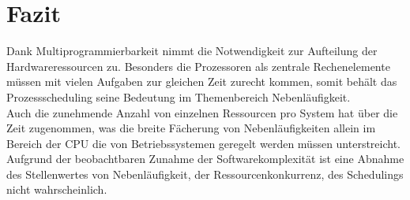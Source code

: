 \section{Fazit}
Dank Multiprogrammierbarkeit nimmt die Notwendigkeit zur Aufteilung der Hardwareressourcen zu. Besonders 
die Prozessoren als zentrale Rechenelemente müssen mit vielen Aufgaben zur gleichen Zeit zurecht kommen, 
somit behält das Prozessscheduling seine Bedeutung im Themenbereich Nebenläufigkeit. \\
Auch die zunehmende Anzahl von einzelnen Ressourcen pro System hat über die Zeit zugenommen, was die breite 
Fächerung von Nebenläufigkeiten allein im Bereich der CPU die von Betriebssystemen geregelt werden müssen 
unterstreicht. \\
Aufgrund der beobachtbaren Zunahme der Softwarekomplexität ist eine Abnahme des Stellenwertes von 
Nebenläufigkeit, der Ressourcenkonkurrenz, des Schedulings nicht wahrscheinlich.
\\ \\ \\ \\ \\ \\ \\ \\ \\ \\ \\ \\ \\ \\ \\ \\ \\ \\ \\ \\ \\ \\ \\ \\ \\ \\ \\


\pagebreak
\nocite{*}
